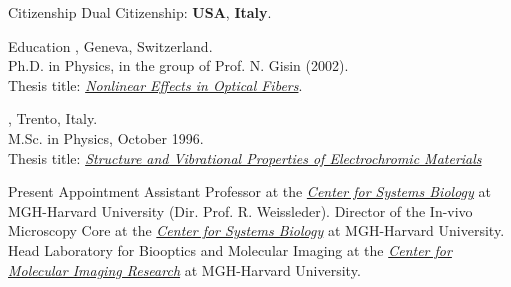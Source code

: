 \documentclass{resume}
\author{~~~~~~~~Claudio Vinegoni, Ph.D.}
\begin{document}
\maketitle

\begin{category}{Citizenship}
\citemnobullet  Dual Citizenship: {\bf{USA}}, {\bf{Italy}}.
\end{category}


\begin{category}{Education}
, Geneva, Switzerland.\\
Ph.D. in Physics, in the group of Prof. N. Gisin (2002).\\
Thesis title: \href{https://cvinegoni.github.io/publications/thesis/Thesis-PHD.pdf}{{\em Nonlinear Effects in Optical
Fibers}}.

, Trento, Italy. \\
M.Sc. in Physics, October 1996.\\
Thesis title: \href{https://cvinegoni.github.io/publications/thesis/Thesis-MSc.pdf}{{\em Structure and Vibrational
Properties of Electrochromic
Materials}}
\citemnobullet
\citemnobullet

\begin{category}{Present Appointment}
\citembullet Assistant Professor at the
\href{http://csb.mgh.harvard.edu}{{\em Center for Systems
Biology}}  at MGH-Harvard University (Dir.
Prof. R. Weissleder). \citembullet Director of the In-vivo
Microscopy Core at the \href{http://csb.mgh.harvard.edu}{{\em Center for Systems
Biology}} at MGH-Harvard University. \citembullet Head Laboratory
for Biooptics and Molecular Imaging at the \href{https://cmir.mgh.harvard.edu/lbmi}{{\em
Center for Molecular Imaging
Research}} at MGH-Harvard University.
\end{category}


\end{category}
\end{document}
